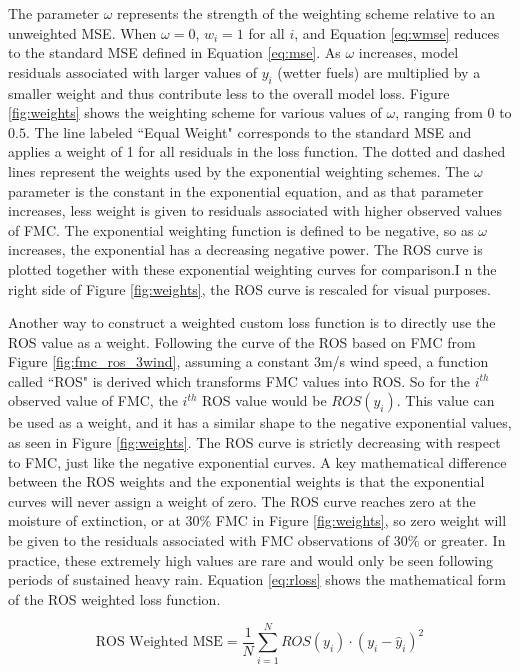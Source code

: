 \documentclass[11pt]{article}%
\begin{document}
The parameter $\omega$ represents the strength of the weighting scheme relative to an unweighted MSE. When $\omega = 0$, $w_i = 1$ for all $i$, and Equation \ref{eq:wmse} reduces to the standard MSE defined in Equation \ref{eq:mse}. As $\omega$ increases, model residuals associated with larger values of $y_i$ (wetter fuels) are multiplied by a smaller weight and thus contribute less to the overall model loss. Figure \ref{fig:weights} shows the weighting scheme for various values of $\omega$, ranging from $0$ to $0.5$. The line labeled ``Equal Weight" corresponds to the standard MSE and applies a weight of 1 for all residuals in the loss function. The dotted and dashed lines represent the weights used by the exponential weighting schemes. The $\omega$ parameter is the constant in the exponential equation, and as that parameter increases, less weight is given to residuals associated with higher observed values of FMC. The exponential weighting function is defined to be negative, so as $\omega$ increases, the exponential has a decreasing negative power. The ROS curve is plotted together with these exponential weighting curves for comparison.I n the right side of Figure \ref{fig:weights}, the ROS curve is rescaled for visual purposes.

Another way to construct a weighted custom loss function is to directly use the ROS value as a weight. Following the curve of the ROS based on FMC from Figure \ref{fig:fmc_ros_3wind}, assuming a constant 3m/s wind speed, a function called ``ROS" is derived which transforms FMC values into ROS. So for the $i^{th}$ observed value of FMC, the $i^{th}$ ROS value would be $ROS(y_i)$. This value can be used as a weight, and it has a similar shape to the negative exponential values, as seen in Figure \ref{fig:weights}. The ROS curve is strictly decreasing with respect to FMC, just like the negative exponential curves. A key mathematical difference between the ROS weights and the exponential weights is that the exponential curves will never assign a weight of zero. The ROS curve reaches zero at the moisture of extinction, or at 30\% FMC in Figure \ref{fig:weights}, so zero weight will be given to the residuals associated with FMC observations of 30\% or greater. In practice, these extremely high values are rare and would only be seen following periods of sustained heavy rain. Equation \ref{eq:rloss} shows the mathematical form of the ROS weighted loss function.

\begin{equation}
    \label{eq:rloss}
    \text{ROS Weighted MSE} = \frac{1}{N}\sum_{i=1}^N ROS(y_i)\cdot (y_i - \hat y_i)^2
\end{equation}
\end{document}
